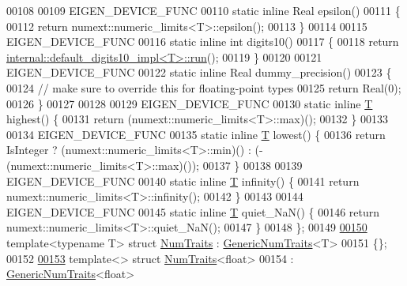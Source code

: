 \begin{DoxyCode}
00108 
00109   EIGEN\_DEVICE\_FUNC
00110   \textcolor{keyword}{static} \textcolor{keyword}{inline} Real epsilon()
00111   \{
00112     \textcolor{keywordflow}{return} numext::numeric\_limits<T>::epsilon();
00113   \}
00114 
00115   EIGEN\_DEVICE\_FUNC
00116   \textcolor{keyword}{static} \textcolor{keyword}{inline} \textcolor{keywordtype}{int} digits10()
00117   \{
00118     \textcolor{keywordflow}{return} \hyperlink{struct_eigen_1_1internal_1_1default__digits10__impl}{internal::default\_digits10\_impl<T>::run}();
00119   \}
00120 
00121   EIGEN\_DEVICE\_FUNC
00122   \textcolor{keyword}{static} \textcolor{keyword}{inline} Real dummy\_precision()
00123   \{
00124     \textcolor{comment}{// make sure to override this for floating-point types}
00125     \textcolor{keywordflow}{return} Real(0);
00126   \}
00127 
00128 
00129   EIGEN\_DEVICE\_FUNC
00130   \textcolor{keyword}{static} \textcolor{keyword}{inline} \hyperlink{group___sparse_core___module}{T} highest() \{
00131     \textcolor{keywordflow}{return} (numext::numeric\_limits<T>::max)();
00132   \}
00133 
00134   EIGEN\_DEVICE\_FUNC
00135   \textcolor{keyword}{static} \textcolor{keyword}{inline} \hyperlink{group___sparse_core___module}{T} lowest()  \{
00136     \textcolor{keywordflow}{return} IsInteger ? (numext::numeric\_limits<T>::min)() : (-(numext::numeric\_limits<T>::max)());
00137   \}
00138 
00139   EIGEN\_DEVICE\_FUNC
00140   \textcolor{keyword}{static} \textcolor{keyword}{inline} \hyperlink{group___sparse_core___module}{T} infinity() \{
00141     \textcolor{keywordflow}{return} numext::numeric\_limits<T>::infinity();
00142   \}
00143 
00144   EIGEN\_DEVICE\_FUNC
00145   \textcolor{keyword}{static} \textcolor{keyword}{inline} \hyperlink{group___sparse_core___module}{T} quiet\_NaN() \{
00146     \textcolor{keywordflow}{return} numext::numeric\_limits<T>::quiet\_NaN();
00147   \}
00148 \};
00149 
\hyperlink{group___core___module}{00150} \textcolor{keyword}{template}<\textcolor{keyword}{typename} T> \textcolor{keyword}{struct }\hyperlink{group___core___module_struct_eigen_1_1_num_traits}{NumTraits} : \hyperlink{struct_eigen_1_1_generic_num_traits}{GenericNumTraits}<T>
00151 \{\};
00152 
\hyperlink{struct_eigen_1_1_num_traits_3_01float_01_4}{00153} \textcolor{keyword}{template}<> \textcolor{keyword}{struct }\hyperlink{group___core___module_struct_eigen_1_1_num_traits}{NumTraits}<float>
00154   : \hyperlink{struct_eigen_1_1_generic_num_traits}{GenericNumTraits}<float>

\end{DoxyCode}
